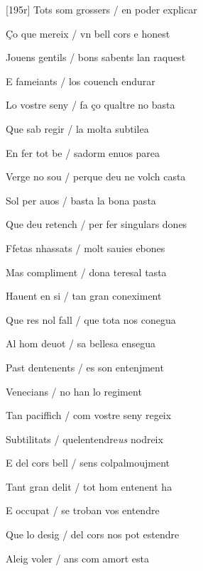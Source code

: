 \documentclass[12pt]{article}
\begin{document}
\begin{estrofa}

 [195r] Tots som grossers / en poder explicar

 \c{C}o que mereix / vn bell cors e honest

 Jouens gentils / bons sabents lan raquest

 E fameiants / los couench endurar

 Lo vostre seny / fa \c{c}o qualtre no basta

 Que sab regir / la molta subtilea

 En fer tot be / sadorm enuos parea

 Verge no sou / perque deu ne volch casta

\end{estrofa}



\begin{estrofa}

 Sol per auos / basta la bona pasta

 Que deu retench / per fer singulars dones

 Ffetas nhassats / molt sauies ebones

 Mas compliment / dona teresal tasta

 Hauent en si / tan gran coneximent

 Que res nol fall / que tota nos conegua

 Al hom deuot / sa bellesa ensegua

 Past dentenents / es son entenjment

\end{estrofa}



\begin{estrofa}

 Venecians / no han lo regiment

 Tan paciffich / com vostre seny regeix

 Subtilitats / quelentendre\textit{us} nodreix

 E del cors bell / sens colpalmoujment

 Tant gran delit / tot hom entenent ha

 E occupat / se troban vos entendre

 Que lo desig / del cors nos pot estendre

 Aleig voler / ans com amort esta

\end{estrofa}
\end{document}
